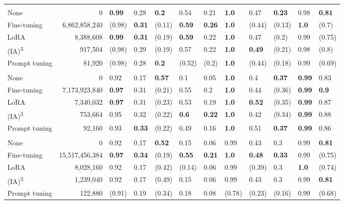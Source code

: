 \begin{table*}[htbp]
\begin{threeparttable}
\begin{tabularx}{\textwidth}{lrLLLLL!{\color{white}\ }LLLLL}
         \bigstrut \\*
        None & 0 & \textbf{0.99} & 0.28 & \textbf{0.2} & 0.54 & 0.21 & \textbf{1.0} & 0.47 & \textbf{0.23} & 0.98 & \textbf{0.81} \\
        Fine-tuning & 6,862,858,240 & (0.98) & \textbf{0.31} & (0.11) & \textbf{0.59} & \textbf{0.26} & \textbf{1.0} & (0.44) & (0.13) & \textbf{1.0} & (0.7) \\
        LoRA & 8,388,608 & \textbf{0.99} & \textbf{0.31} & (0.19) & \textbf{0.59} & 0.22 & \textbf{1.0} & 0.47 & (0.2) & 0.99 & (0.75) \\
        (IA)\textsuperscript{3} & 917,504 & (0.98) & 0.29 & (0.19) & 0.57 & 0.22 & \textbf{1.0} & \textbf{0.49} & (0.21) & 0.98 & (0.8) \\
        Prompt tuning & 81,920 & (0.98) & 0.28 & \textbf{0.2} & (0.52) & (0.2) & \textbf{1.0} & (0.44) & (0.18) & 0.99 & (0.69) \\

         \bigstrut \\*
        None & 0 & 0.92 & 0.17 & \textbf{0.57} & 0.1 & 0.05 & \textbf{1.0} & 0.4 & \textbf{0.37} & \textbf{0.99} & 0.83 \\
        Fine-tuning & 7,173,923,840 & \textbf{0.97} & 0.31 & (0.21) & 0.55 & 0.2 & \textbf{1.0} & 0.44 & (0.36) & \textbf{0.99} & \textbf{0.9} \\
        LoRA & 7,340,032 & \textbf{0.97} & 0.31 & (0.23) & 0.53 & 0.19 & \textbf{1.0} & \textbf{0.52} & (0.35) & \textbf{0.99} & 0.87 \\
        (IA)\textsuperscript{3} & 753,664 & 0.95 & 0.32 & (0.22) & \textbf{0.6} & \textbf{0.22} & \textbf{1.0} & 0.42 & (0.34) & \textbf{0.99} & 0.88 \\
        Prompt tuning & 92,160 & 0.93 & \textbf{0.33} & (0.22) & 0.49 & 0.16 & \textbf{1.0} & 0.51 & \textbf{0.37} & \textbf{0.99} & 0.86 \\

         \bigstrut \\*
        None & 0 & 0.92 & 0.17 & \textbf{0.52} & 0.15 & 0.06 & 0.99 & 0.43 & 0.3 & 0.99 & \textbf{0.81} \\
        Fine-tuning & 15,517,456,384 & \textbf{0.97} & \textbf{0.34} & (0.19) & \textbf{0.55} & \textbf{0.21} & \textbf{1.0} & \textbf{0.48} & \textbf{0.33} & 0.99 & (0.75) \\
        LoRA & 8,028,160 & 0.92 & 0.17 & (0.42) & (0.14) & 0.06 & 0.99 & (0.39) & 0.3 & \textbf{1.0} & (0.74) \\
        (IA)\textsuperscript{3} & 1,239,040 & 0.92 & 0.17 & (0.49) & 0.15 & 0.06 & 0.99 & 0.43 & 0.3 & 0.99 & \textbf{0.81} \\
        Prompt tuning & 122,880 & (0.91) & 0.19 & (0.34) & 0.18 & 0.08 & (0.78) & (0.23) & (0.16) & 0.99 & (0.68) \\


\end{tabularx}
\end{threeparttable}
\end{table*}
